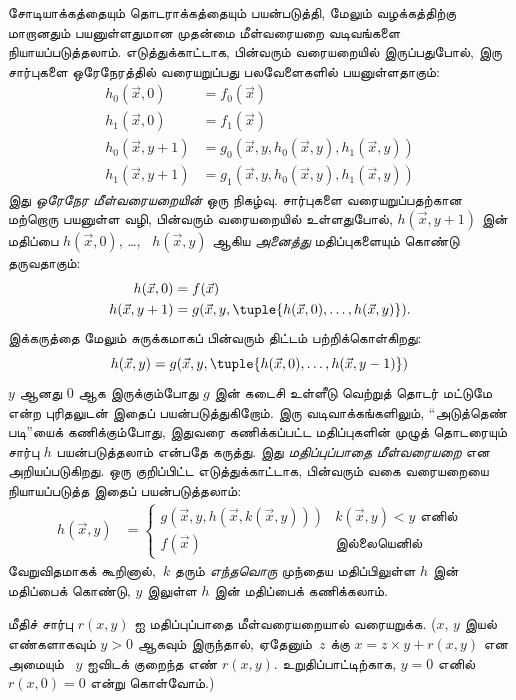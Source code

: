 \documentclass[../../../include/open-logic-section]{subfiles}
\begin{document}


சோடியாக்கத்தையும் தொடராக்கத்தையும் பயன்படுத்தி, மேலும் வழக்கத்திற்கு
மாறானதும் பயனுள்ளதுமான முதன்மை மீள்வரையறை வடிவங்களை நியாயப்படுத்தலாம்.
எடுத்துக்காட்டாக, பின்வரும் வரையறையில் இருப்பதுபோல், இரு சார்புகளை
ஒரேநேரத்தில் வரையறுப்பது பலவேளைகளில் பயனுள்ளதாகும்:
\begin{align*}
h_0(\vec x, 0) & = f_0(\vec x) \\
h_1(\vec x, 0) & = f_1(\vec x) \\
h_0(\vec x, y+1) & = g_0(\vec x, y, h_0(\vec x, y), h_1(\vec x, y)) \\
h_1(\vec x, y+1) & = g_1(\vec x, y, h_0(\vec x, y), h_1(\vec x, y))
\end{align*}
இது \emph{ஒரேநேர மீள்வரையறையின்} ஒரு நிகழ்வு. சார்புகளை
வரையறுப்பதற்கான மற்றொரு பயனுள்ள வழி, பின்வரும் வரையறையில் உள்ளதுபோல்,
$h(\vec x, y+1)$ இன் மதிப்பை $h(\vec x, 0)$, \dots,
~$h(\vec x, y)$ ஆகிய \emph{அனைத்து} மதிப்புகளையும் கொண்டு தருவதாகும்:
\begin{align*}
h(\vec x, 0) & = f(\vec x) \\
h(\vec x, y+1) & = g(\vec x, y, \tuple{h(\vec x, 0), \dots, h(\vec x, y)}).
\end{align*}
இக்கருத்தை மேலும் சுருக்கமாகப் பின்வரும் திட்டம் பற்றிக்கொள்கிறது:
\[
h(\vec x, y) = g(\vec x, y, \tuple{h(\vec x, 0), \dots, h(\vec x, y-1)})
\]
$y$ ஆனது $0$ ஆக இருக்கும்போது $g$ இன் கடைசி உள்ளீடு வெற்றுத்
தொடர் மட்டுமே என்ற புரிதலுடன் இதைப் பயன்படுத்துகிறோம். இரு
வடிவாக்கங்களிலும், “அடுத்தெண் படி”யைக் கணிக்கும்போது, இதுவரை
கணிக்கப்பட்ட மதிப்புகளின் முழுத் தொடரையும் சார்பு $h$ பயன்படுத்தலாம்
என்பதே கருத்து. இது \emph{மதிப்புப்பாதை மீள்வரையறை} என அறியப்படுகிறது.
ஒரு குறிப்பிட்ட எடுத்துக்காட்டாக, பின்வரும் வகை வரையறையை நியாயப்படுத்த
இதைப் பயன்படுத்தலாம்:
\begin{align*}
h(\vec x, y) & = \begin{cases}
  g(\vec x, y, h(\vec x, k(\vec x, y))) & \text{$k(\vec x, y) < y$ எனில்} \\
  f(\vec x) & \text{இல்லையெனில்}
\end{cases}
\end{align*}
வேறுவிதமாகக் கூறினால்,~$k$ தரும் \emph{எந்தவொரு} முந்தைய
மதிப்பிலுள்ள $h$ இன் மதிப்பைக் கொண்டு, $y$ இலுள்ள $h$ இன்
மதிப்பைக் கணிக்கலாம்.


\begin{prob}
  மீதிச் சார்பு $r(x,y)$ ஐ மதிப்புப்பாதை மீள்வரையறையால் வரையறுக்க.
  ($x$, $y$ இயல் எண்களாகவும் $y > 0$ ஆகவும் இருந்தால்,
  ஏதேனும்~$z$ க்கு $x = z\times y + r(x,y)$ என அமையும்
  ~$y$ ஐவிடக் குறைந்த எண் $r(x,y)$. உறுதிப்பாட்டிற்காக,
  $y=0$ எனில் $r(x,0) = 0$ என்று கொள்வோம்.)
\end{prob}
\end{document}
